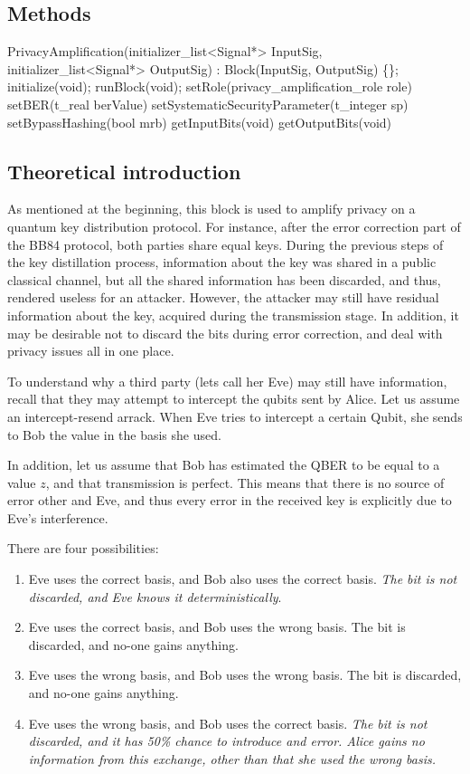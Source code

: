 \subsection*{Methods}

PrivacyAmplification(initializer\_list<Signal*> InputSig,
initializer\_list<Signal*> OutputSig) : Block(InputSig, OutputSig) \{\};
\bigbreak
initialize(void);
\bigbreak
runBlock(void);
\bigbreak
setRole(privacy\_amplification\_role role)
\bigbreak
setBER(t\_real berValue)
\bigbreak
setSystematicSecurityParameter(t\_integer sp)
\bigbreak
setBypassHashing(bool mrb)
\bigbreak
getInputBits(void)
\bigbreak
getOutputBits(void)
\bigbreak

\subsection*{Theoretical introduction}

As mentioned at the beginning, this block is used to amplify privacy on a
quantum key distribution protocol. For instance, after the error correction part
of the BB84 protocol, both parties share equal keys. During the previous steps
of the key distillation process, information about the key was shared in a
public classical channel, but all the shared information has been discarded, and
thus, rendered useless for an attacker. However, the attacker may still have
residual information about the key, acquired during the transmission stage. In
addition, it may be desirable not to discard the bits during error correction,
and deal with privacy issues all in one place.

To understand why a third party (lets call her Eve) may still have information,
recall that they may attempt to intercept the qubits sent by Alice. Let us
assume an intercept-resend arrack. When Eve tries to intercept a certain Qubit,
she sends to Bob the value in the basis she used.

In addition, let us assume that Bob has estimated the QBER to be equal
to a value $z$, and that transmission is perfect. This means that there is no
source of error other and Eve, and thus every error in the received key is
explicitly due to Eve's interference.

There are four possibilities:
\begin{enumerate}
	\item Eve uses the correct basis, and Bob also uses the correct basis. \textit{The
	bit is not discarded, and Eve knows it deterministically}.
	\item Eve uses the correct basis, and Bob uses the wrong basis. The bit is
	discarded, and no-one gains anything.
	\item Eve uses the wrong basis, and Bob uses the wrong basis. The bit is
	discarded, and no-one gains anything.
	\item Eve uses the wrong basis, and Bob uses the correct basis. \textit{The
	bit is not discarded, and it has 50\% chance to introduce and error. Alice
	gains no information from this exchange, other than that she used the wrong
	basis.}
\end{enumerate}

